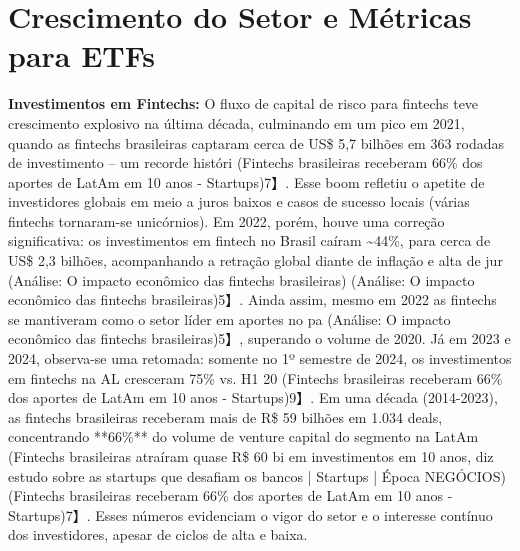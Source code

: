 \documentclass[12pt]{article}
\begin{document}
\section*{Crescimento do Setor e Métricas para ETFs 🚀}

\textbf{Investimentos em Fintechs:} O fluxo de capital de risco para fintechs teve crescimento explosivo na última década, culminando em um pico em 2021, quando as fintechs brasileiras captaram cerca de US\$ 5,7 bilhões em 363 rodadas de investimento – um recorde históri (Fintechs brasileiras receberam 66\% dos aportes de LatAm em 10 anos - Startups)7】. Esse boom refletiu o apetite de investidores globais em meio a juros baixos e casos de sucesso locais (várias fintechs tornaram-se unicórnios). Em 2022, porém, houve uma correção significativa: os investimentos em fintech no Brasil caíram \textasciitilde44\%, para cerca de US\$ 2,3 bilhões, acompanhando a retração global diante de inflação e alta de jur (Análise: O impacto econômico das fintechs brasileiras) (Análise: O impacto econômico das fintechs brasileiras)5】. Ainda assim, mesmo em 2022 as fintechs se mantiveram como o setor líder em aportes no pa (Análise: O impacto econômico das fintechs brasileiras)5】, superando o volume de 2020. Já em 2023 e 2024, observa-se uma retomada: somente no 1º semestre de 2024, os investimentos em fintechs na AL cresceram 75\% vs. H1 20 (Fintechs brasileiras receberam 66\% dos aportes de LatAm em 10 anos - Startups)9】. Em uma década (2014-2023), as fintechs brasileiras receberam mais de R\$ 59 bilhões em 1.034 deals, concentrando **66\%** do volume de venture capital do segmento na LatAm (Fintechs brasileiras atraíram quase R\$ 60 bi em investimentos em 10 anos, diz estudo sobre as startups que desafiam os bancos | Startups | Época NEGÓCIOS) (Fintechs brasileiras receberam 66\% dos aportes de LatAm em 10 anos - Startups)7】. Esses números evidenciam o vigor do setor e o interesse contínuo dos investidores, apesar de ciclos de alta e baixa.
\end{document}
